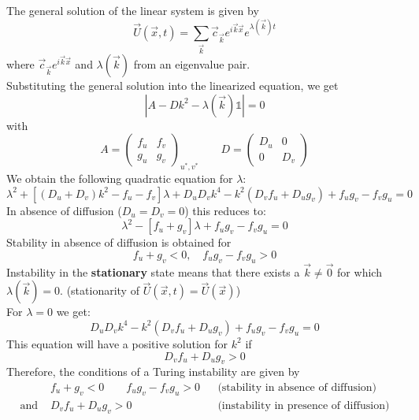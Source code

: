 The general solution of the linear system is given by
\begin{equation*}
	\vec{U}(\vec{x},t)=\sum\limits_{\vec{k}}\vec{c}_{\vec{k}}e^{i\vec{k}\vec{x}}e^{\lambda(\vec{k})t}
\end{equation*}
where $\vec{c}_{\vec{k}}e^{i\vec{k}\vec{x}}$ and $\lambda(\vec{k})$ from an eigenvalue pair.\\
Substituting the general solution into the linearized equation, we get
\begin{equation*}
	\left|A-Dk^2-\lambda(\vec{k})\mathds{1}\right|=0
\end{equation*}
with
\begin{equation*}
	A=\begin{pmatrix} f_u & f_v \\ g_u & g_v\end{pmatrix}_{u^*,v^*} \qquad D=\begin{pmatrix} D_u & 0 \\ 0 & D_v\end{pmatrix}
\end{equation*}
We obtain the following quadratic equation for $\lambda$:
\begin{equation*}
	\lambda^2+\left[\left(D_u+D_v\right)k^2-f_u-f_v\right]\lambda+D_uD_vk^4-k^2\left(D_vf_u+D_ug_v\right)+f_ug_v-f_vg_u=0
\end{equation*}
In absence of diffusion ($D_u=D_v=0$) this reduces to:
\begin{equation*}
	\lambda^2 -\left[f_u+g_v\right]\lambda + f_ug_v-f_vg_u=0
\end{equation*}
Stability in absence of diffusion is obtained for
\begin{equation*}
	f_u+g_v <0,\quad f_ug_v-f_vg_u>0
\end{equation*}
Instability in the \textbf{stationary} state means that there exists a $\vec{k}\neq \vec{0}$ for which $\lambda(\vec{k})=0$. (stationarity of $\vec{U}(\vec{x},t)=\vec{U}(\vec{x})$)\\
For $\lambda=0$ we get:
\begin{equation*}
	D_uD_vk^4-k^2\left(D_vf_u+D_ug_v\right)+f_ug_v-f_vg_u=0
\end{equation*}
This equation will have a positive solution for $k^2$ if
\begin{equation*}
	D_vf_u+D_ug_v>0
\end{equation*}
Therefore, the conditions of a Turing instability are given by
\begin{align*}
	&f_u+g_v<0\qquad f_ug_v-f_vg_u>0 & &\text{(stability in absence of diffusion)}\\
	\text{and } &D_vf_u+D_ug_v>0 & &\text{(instability in presence of diffusion)}
\end{align*}
